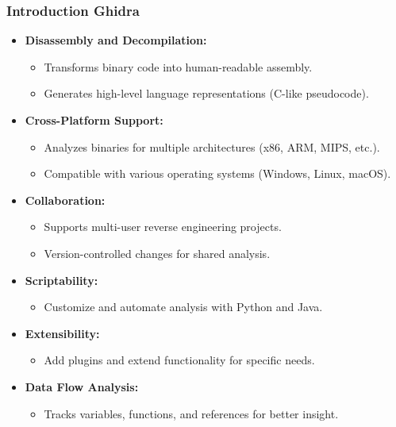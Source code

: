 \begin{frame}
\frametitle{Introduction Ghidra}

\begin{itemize}
    \item \textbf{Disassembly and Decompilation:}
    \begin{itemize}
        \item Transforms binary code into human-readable assembly.
        \item Generates high-level language representations (C-like pseudocode).
    \end{itemize}
    \item \textbf{Cross-Platform Support:}
    \begin{itemize}
        \item Analyzes binaries for multiple architectures (x86, ARM, MIPS, etc.).
        \item Compatible with various operating systems (Windows, Linux, macOS).
    \end{itemize}
    \item \textbf{Collaboration:}
    \begin{itemize}
        \item Supports multi-user reverse engineering projects.
        \item Version-controlled changes for shared analysis.
    \end{itemize}
    \item \textbf{Scriptability:}
    \begin{itemize}
        \item Customize and automate analysis with Python and Java.
    \end{itemize}
    \item \textbf{Extensibility:}
    \begin{itemize}
        \item Add plugins and extend functionality for specific needs.
    \end{itemize}
    \item \textbf{Data Flow Analysis:}
    \begin{itemize}
        \item Tracks variables, functions, and references for better insight.
    \end{itemize}
\end{itemize}

\end{frame}

